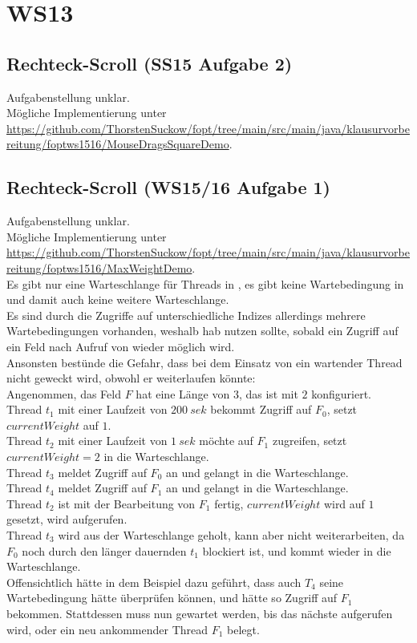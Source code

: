 \chapter{WS13}\label{ch:klausurws5-16}

\section{Rechteck-Scroll (SS15 Aufgabe 2)}

Aufgabenstellung unklar.\\
Mögliche Implementierung unter \url{https://github.com/ThorstenSuckow/fopt/tree/main/src/main/java/klausurvorbereitung/foptws1516/MouseDragsSquareDemo}.

\section{Rechteck-Scroll (WS15/16 Aufgabe 1)}

Aufgabenstellung unklar.\\
Mögliche Implementierung unter \url{https://github.com/ThorstenSuckow/fopt/tree/main/src/main/java/klausurvorbereitung/foptws1516/MaxWeightDemo}.\\

\noindent
Es gibt nur eine Warteschlange für Threads in , es gibt keine Wartebedingung in  und damit auch keine weitere Warteschlange.\\
Es sind durch die Zugriffe auf unterschiedliche Indizes allerdings mehrere Wartebedingungen vorhanden, weshalb hab  nutzen sollte,
sobald ein Zugriff auf ein Feld nach Aufruf von  wieder möglich wird.\\
Ansonsten bestünde die Gefahr, dass bei dem Einsatz von  ein wartender Thread nicht geweckt wird, obwohl er weiterlaufen könnte:\\
Angenommen, das Feld $F$ hat eine Länge von $3$, das  ist mit $2$ konfiguriert.
Thread $t_1$ mit einer Laufzeit von $200\ sek$ bekommt Zugriff auf $F_0$, setzt $currentWeight$ auf $1$.\\
Thread $t_2$ mit einer Laufzeit von $1\ sek$ möchte auf $F_1$ zugreifen, setzt $currentWeight=2$ in die Warteschlange.\\
Thread $t_3$ meldet Zugriff auf $F_0$ an und gelangt in die Warteschlange.\\
Thread $t_4$ meldet Zugriff auf $F_1$ an und gelangt in die Warteschlange.\\
Thread $t_2$ ist mit der Bearbeitung von $F_1$ fertig, $currentWeight$ wird auf $1$ gesetzt,  wird aufgerufen.\\
Thread $t_3$ wird aus der Warteschlange geholt, kann aber nicht weiterarbeiten, da $F_0$ noch durch den länger dauernden $t_1$ blockiert ist, und kommt wieder in die Warteschlange.\\

\noindent
Offensichtlich hätte in dem Beispiel  dazu geführt, dass auch $T_4$ seine Wartebedingung hätte überprüfen können, und hätte so Zugriff auf $F_1$ bekommen.
Stattdessen muss nun gewartet werden, bis das nächste  aufgerufen wird, oder ein neu ankommender Thread $F_1$ belegt.

